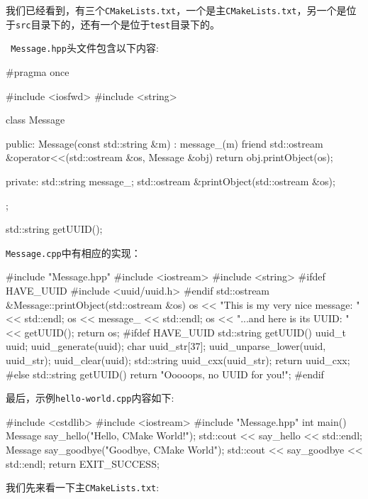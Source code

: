 我们已经看到，有三个\texttt{CMakeLists.txt}，一个是主\texttt{CMakeLists.txt}，另一个是位于\texttt{src}目录下的，还有一个是位于\texttt{test}目录下的。

\texttt{ Message.hpp}头文件包含以下内容:

\begin{codebox}[cpp]
#pragma once

#include <iosfwd>
#include <string>

class Message
{
public:
  Message(const std::string &m) : message_(m) {}
  friend std::ostream &operator<<(std::ostream &os, Message &obj)
  {
    return obj.printObject(os);
  }

private:
  std::string message_;
  std::ostream &printObject(std::ostream &os);
};

std::string getUUID();
\end{codebox}

\texttt{Message.cpp}中有相应的实现：

\begin{codebox}[cpp]
#include "Message.hpp"
#include <iostream>
#include <string>
#ifdef HAVE_UUID
#include <uuid/uuid.h>
#endif
std::ostream &Message::printObject(std::ostream &os)
{
  os << "This is my very nice message: " << std::endl;
  os << message_ << std::endl;
  os << "...and here is its UUID: " << getUUID();
  return os;
}
#ifdef HAVE_UUID
std::string getUUID()
{
  uuid_t uuid;
  uuid_generate(uuid);
  char uuid_str[37];
  uuid_unparse_lower(uuid, uuid_str);
  uuid_clear(uuid);
  std::string uuid_cxx(uuid_str);
  return uuid_cxx;
}
#else
std::string getUUID()
{
  return "Ooooops, no UUID for you!";
}
#endif
\end{codebox}

最后，示例\texttt{hello-world.cpp}内容如下:

\begin{codebox}[cpp]
#include <cstdlib>
#include <iostream>
#include "Message.hpp"
int main()
{
  Message say_hello("Hello, CMake World!");
  std::cout << say_hello << std::endl;
  Message say_goodbye("Goodbye, CMake World");
  std::cout << say_goodbye << std::endl;
  return EXIT_SUCCESS;
}
\end{codebox}


我们先来看一下主\texttt{CMakeLists.txt}:

